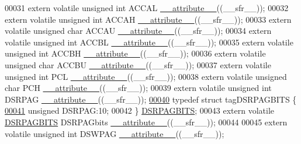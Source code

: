 \begin{DoxyCode}
00031 \textcolor{keyword}{extern} \textcolor{keyword}{volatile} \textcolor{keywordtype}{unsigned} \textcolor{keywordtype}{int}  ACCAL \hyperlink{a00009_a493c46f03454991ccc5aa7a6e1dfb2a7}{\_\_attribute\_\_}((\_\_sfr\_\_));
00032 \textcolor{keyword}{extern} \textcolor{keyword}{volatile} \textcolor{keywordtype}{unsigned} \textcolor{keywordtype}{int}  ACCAH \hyperlink{a00009_a493c46f03454991ccc5aa7a6e1dfb2a7}{\_\_attribute\_\_}((\_\_sfr\_\_));
00033 \textcolor{keyword}{extern} \textcolor{keyword}{volatile} \textcolor{keywordtype}{unsigned} \textcolor{keywordtype}{char} ACCAU \hyperlink{a00009_a493c46f03454991ccc5aa7a6e1dfb2a7}{\_\_attribute\_\_}((\_\_sfr\_\_));
00034 \textcolor{keyword}{extern} \textcolor{keyword}{volatile} \textcolor{keywordtype}{unsigned} \textcolor{keywordtype}{int}  ACCBL \hyperlink{a00009_a493c46f03454991ccc5aa7a6e1dfb2a7}{\_\_attribute\_\_}((\_\_sfr\_\_));
00035 \textcolor{keyword}{extern} \textcolor{keyword}{volatile} \textcolor{keywordtype}{unsigned} \textcolor{keywordtype}{int}  ACCBH \hyperlink{a00009_a493c46f03454991ccc5aa7a6e1dfb2a7}{\_\_attribute\_\_}((\_\_sfr\_\_));
00036 \textcolor{keyword}{extern} \textcolor{keyword}{volatile} \textcolor{keywordtype}{unsigned} \textcolor{keywordtype}{char} ACCBU \hyperlink{a00009_a493c46f03454991ccc5aa7a6e1dfb2a7}{\_\_attribute\_\_}((\_\_sfr\_\_));
00037 \textcolor{keyword}{extern} \textcolor{keyword}{volatile} \textcolor{keywordtype}{unsigned} \textcolor{keywordtype}{int}  PCL \hyperlink{a00009_a493c46f03454991ccc5aa7a6e1dfb2a7}{\_\_attribute\_\_}((\_\_sfr\_\_));
00038 \textcolor{keyword}{extern} \textcolor{keyword}{volatile} \textcolor{keywordtype}{unsigned} \textcolor{keywordtype}{char} PCH \hyperlink{a00009_a493c46f03454991ccc5aa7a6e1dfb2a7}{\_\_attribute\_\_}((\_\_sfr\_\_));
00039 \textcolor{keyword}{extern} \textcolor{keyword}{volatile} \textcolor{keywordtype}{unsigned} \textcolor{keywordtype}{int}  DSRPAG \hyperlink{a00009_a493c46f03454991ccc5aa7a6e1dfb2a7}{\_\_attribute\_\_}((\_\_sfr\_\_));
\hypertarget{a00009_source_l00040}{}\hyperlink{a00008}{00040} \textcolor{keyword}{typedef} \textcolor{keyword}{struct }tagDSRPAGBITS \{
\hypertarget{a00009_source_l00041}{}\hyperlink{a00008_aff447cf33b47980fe8688cfbbc9ad6e2}{00041}   \textcolor{keywordtype}{unsigned} DSRPAG:10;
00042 \} \hyperlink{a00008_dd/d07/a00433}{DSRPAGBITS};
00043 \textcolor{keyword}{extern} \textcolor{keyword}{volatile} \hyperlink{a00008_dd/d07/a00433}{DSRPAGBITS} DSRPAGbits \hyperlink{a00009_a493c46f03454991ccc5aa7a6e1dfb2a7}{\_\_attribute\_\_}((\_\_sfr\_\_));
00044 
00045 \textcolor{keyword}{extern} \textcolor{keyword}{volatile} \textcolor{keywordtype}{unsigned} \textcolor{keywordtype}{int}  DSWPAG \hyperlink{a00009_a493c46f03454991ccc5aa7a6e1dfb2a7}{\_\_attribute\_\_}((\_\_sfr\_\_));

\end{DoxyCode}
